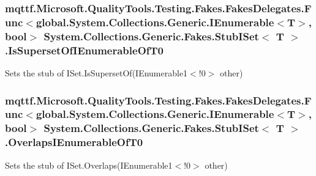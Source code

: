 \hypertarget{class_system_1_1_collections_1_1_generic_1_1_fakes_1_1_stub_i_set_3_01_t_01_4_aad4813553da403bf3a2547c47b0dc82c}{
\subsubsection[{Is\-Superset\-Of\-I\-Enumerable\-Of\-T0}]{\setlength{\rightskip}{0pt plus 5cm}mqttf.\-Microsoft.\-Quality\-Tools.\-Testing.\-Fakes.\-Fakes\-Delegates.\-Func$<$global.\-System.\-Collections.\-Generic.\-I\-Enumerable$<$T$>$, bool$>$ System.\-Collections.\-Generic.\-Fakes.\-Stub\-I\-Set$<$ T $>$.Is\-Superset\-Of\-I\-Enumerable\-Of\-T0}}\label{class_system_1_1_collections_1_1_generic_1_1_fakes_1_1_stub_i_set_3_01_t_01_4_aad4813553da403bf3a2547c47b0dc82c}


Sets the stub of I\-Set{.\-Is\-Superset\-Of(I\-Enumerable}1$<$!0$>$ other)

\hypertarget{class_system_1_1_collections_1_1_generic_1_1_fakes_1_1_stub_i_set_3_01_t_01_4_a64082d499e9df2f9ad05257a3b5d2536}{
\subsubsection[{Overlaps\-I\-Enumerable\-Of\-T0}]{\setlength{\rightskip}{0pt plus 5cm}mqttf.\-Microsoft.\-Quality\-Tools.\-Testing.\-Fakes.\-Fakes\-Delegates.\-Func$<$global.\-System.\-Collections.\-Generic.\-I\-Enumerable$<$T$>$, bool$>$ System.\-Collections.\-Generic.\-Fakes.\-Stub\-I\-Set$<$ T $>$.Overlaps\-I\-Enumerable\-Of\-T0}}\label{class_system_1_1_collections_1_1_generic_1_1_fakes_1_1_stub_i_set_3_01_t_01_4_a64082d499e9df2f9ad05257a3b5d2536}


Sets the stub of I\-Set{.\-Overlaps(I\-Enumerable}1$<$!0$>$ other)

